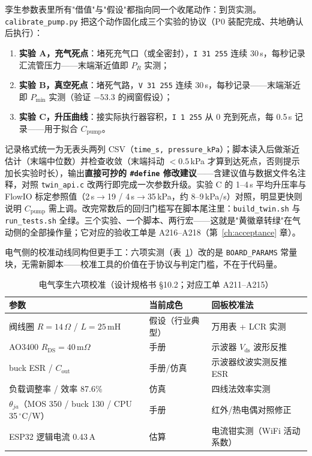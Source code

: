 孪生参数表里所有"借值"与"假设"都指向同一个收尾动作：到货实测。\texttt{calibrate\_pump.py} 把这个动作固化成三个实验的协议（P0 装配完成、共地确认后执行）：

\begin{enumerate}
  \item \textbf{实验 A，充气死点}：堵死充气口（或全密封），\texttt{I 31 255} 连续 30\,s，每秒记录汇流管压力——末端渐近值即 $P_R$ 实测；
  \item \textbf{实验 B，真空死点}：堵死气路，\texttt{V 31 255} 连续 30\,s，每秒记录——末端渐近即 $P_\text{min}$ 实测（验证 $-53.3$ 的阀窗假设）；
  \item \textbf{实验 C，升压曲线}：接实际执行器容积，\texttt{I 1 255} 从 0 充到死点，每 0.5\,s 记录——用于拟合 $C_\text{pump}$。
\end{enumerate}

记录格式统一为无表头两列 CSV（\texttt{time\_s, pressure\_kPa}）；脚本读入后做渐近估计（末端中位数）并检查收敛（末端抖动 $<0.5$\,kPa 才算到达死点，否则提示加长实验时长），输出\textbf{直接可抄的 \texttt{\#define} 修改建议}——含建议值与数据文件名注释，对照 \texttt{twin\_api.c} 改两行即完成一次参数升级。实验 C 的 1--4\,s 平均升压率与 FlowIO 标定参照值（2\,s$\to$19 / 4\,s$\to$35\,kPa，约 8--9\,kPa/s）对照，明显更快则说明 $C_\text{pump}$ 需上调。改完常数后的回归门槛写在脚本尾注里：\texttt{build\_twin.sh} 与 \texttt{run\_tests.sh} 全绿。三个实验、一个脚本、两行宏——这就是"黄徽章转绿"在气动侧的全部操作量；它对应的验收工单是 A216--A218（第~\ref{ch:acceptance} 章）。

电气侧的校准动线同构但更手工：六项实测（表~\ref{tab:twin-board}）改的是 \texttt{BOARD\_PARAMS} 常量块，无需新脚本——校准工具的价值在于协议与判定门槛，不在于代码量。

\begin{table}[htbp]
  \centering
  \caption{电气孪生六项校准（设计规格书 \S10.2；对应工单 A211--A215）}
  \label{tab:twin-board}
  \begin{tabular}{lll}
    \toprule
    参数 & 当前成色 & 回板校准法 \\
    \midrule
    阀线圈 $R{=}14\,\Omega$ / $L{=}25$\,mH & 假设（行业典型） & 万用表 + LCR 实测 \\
    AO3400 $R_\text{DS}{=}40$\,m$\Omega$ & 手册 & 示波器 $V_\text{ds}$ 波形反推 \\
    buck ESR / $C_\text{out}$ & 手册/仿真 & 示波器纹波实测反推 ESR \\
    负载调整率 / 效率 87.6\% & 仿真 & 四线法效率实测 \\
    $\theta_{ja}$（MOS 350 / buck 130 / CPU 35\,$^\circ$C/W） & 手册 & 红外/热电偶对照修正 \\
    ESP32 逻辑电流 0.43\,A & 估算 & 电流钳实测（WiFi 活动系数） \\
    \bottomrule
  \end{tabular}
\end{table}


